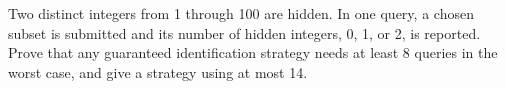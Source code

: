 Two distinct integers from 1 through 100 are hidden. In one query, a chosen subset is submitted and its number of hidden integers, 0, 1, or 2, is reported. Prove that any guaranteed identification strategy needs at least 8 queries in the worst case, and give a strategy using at most 14.
